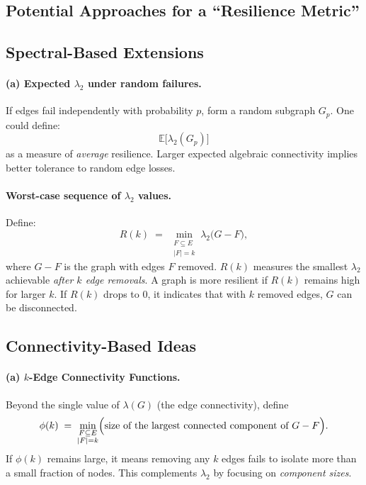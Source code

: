 \documentclass[../../../OAE-SPEC-MAIN.tex]{subfiles}
\begin{document}
\subsection{Potential Approaches for a ``Resilience Metric''}

\subsection{Spectral-Based Extensions}

\paragraph{(a) Expected $\lambda_2$ under random failures.}
If edges fail independently with probability $p$, form a random subgraph $G_p$. One could define:
\[
  \mathbb{E}\bigl[\lambda_2(G_p)\bigr]
\]
as a measure of \emph{average} resilience. Larger expected algebraic connectivity implies better tolerance to random edge losses.

\paragraph{Worst-case sequence of $\lambda_2$ values.}
Define:
\[
  R(k)
  \;=\;
  \min_{\substack{F \subseteq E \\ |F| = k}}
  \lambda_2\bigl(G - F\bigr),
\]
where $G - F$ is the graph with edges $F$ removed. $R(k)$ measures the smallest $\lambda_2$ achievable \emph{after $k$ edge removals}. A graph is more resilient if $R(k)$ remains high for larger $k$. If $R(k)$ drops to $0$, it indicates that with $k$ removed edges, $G$ can be disconnected.

\subsection{Connectivity-Based Ideas}

\paragraph{(a) $k$-Edge Connectivity Functions.}
Beyond the single value of $\lambda(G)$ (the edge connectivity), define
\[
   \phi(k)
   \;=\;
   \min_{\substack{F \subseteq E\\|F|=k}}
   \Bigl(\text{size of the largest connected component of }G-F\Bigr).
\]
If $\phi(k)$ remains large, it means removing any $k$ edges fails to isolate more than a small fraction of nodes. This complements $\lambda_2$ by focusing on \emph{component sizes}.
\end{document}
